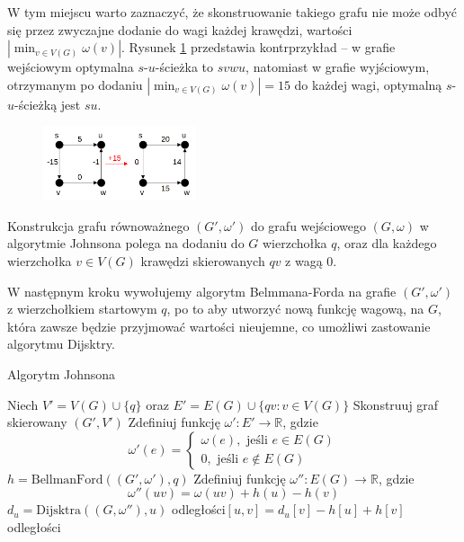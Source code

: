 W tym miejscu warto zaznaczyć, że skonstruowanie takiego
grafu nie może odbyć się przez zwyczajne dodanie
do wagi każdej krawędzi, wartości $|\!\min_{v \in V(G)}{\omega(v)}|$. 
Rysunek \ref{fig:kontrprzyklad_johnson}
przedstawia kontrprzykład -- w grafie wejściowym
optymalna $s$-$u$-ścieżka to $svwu$, natomiast
w grafie wyjściowym, otrzymanym po dodaniu
$|\!\min_{v \in V(G)}{\omega(v)}| = 15$ do każdej 
wagi, optymalną $s$-$u$-ścieżką jest $su$.

\begin{figure}[H]
	\centering
	\includegraphics[width=0.4\textwidth]{data/graf_rownowazny_kontrprzyklad.png}
	\caption{  }
	\label{fig:kontrprzyklad_johnson}
\end{figure}

Konstrukcja grafu równoważnego $(G', \omega')$ 
do grafu wejściowego $(G, \omega)$
w algorytmie Johnsona polega na
dodaniu do $G$ wierzchołka $q$, oraz 
dla każdego wierzchołka $v \in V(G)$ krawędzi
skierowanych $qv$ z wagą 0. 

W następnym kroku wywołujemy algorytm Belmmana-Forda
na grafie $(G', \omega')$ z wierzchołkiem 
startowym $q$, po to aby utworzyć nową funkcję wagową,
na $G$, która zawsze będzie przyjmować wartości 
nieujemne, co umożliwi zastowanie 
algorytmu Dijsktry. 

\begin{algorithm}[H]
	\caption{Algorytm Johnsona}
	\begin{algorithmic}[1]
		\State Niech $V'=V(G) \cup \{q\}$ oraz 
		$E' = E(G) \cup \{qv : v \in V(G)\}$
		\State Skonstruuj graf skierowany $(G', V')$
		\State Zdefiniuj funkcję $\omega' : E' \to \mathbb{R}$, 
		gdzie 
		\[\omega'(e) = \begin{cases}
			\omega(e), \text{ jeśli } e \in E(G) \\
			0, \text{ jeśli }  e \not \in E(G)   
		\end{cases}\]
		\State $h = \text{BellmanFord}((G', \omega'), q)$
		\State Zdefiniuj funkcję $\omega'' : E(G) \to \mathbb{R}$, 
		gdzie 
		\[\omega''(uv) = \omega(uv) + h(u) - h(v)\]
		\State $d_u = \text{Dijsktra}((G, \omega''), u)$
		\State odległości$[u, v] = d_u[v] - h[u] + h[v]$
		\EndFor
		\EndFor
		\State \Return odległości
		\EndProcedure
	\end{algorithmic}
	\label{Johnson}
\end{algorithm}

